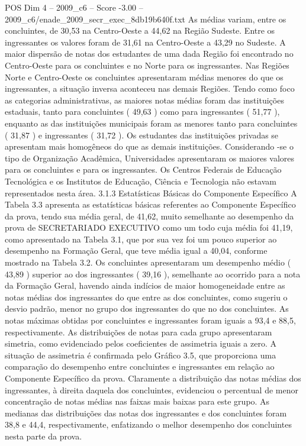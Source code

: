 \begin{textsample}{POS Dim 4 – 2009\_c6 – Score -3.00 – 2009\_c6/enade\_2009\_secr\_exec\_8db19b640f.txt}
As médias variam, entre os concluintes, de 30,53 na Centro-Oeste a 44,62 na Região Sudeste.
Entre os ingressantes os valores foram de 31,61 na Centro-Oeste a 43,29 no Sudeste.
A maior dispersão de notas dos estudantes de uma dada Região foi encontrado no Centro-Oeste para os concluintes e no Norte para os ingressantes.
Nas Regiões Norte e Centro-Oeste os concluintes apresentaram médias menores do que os ingressantes, a situação inversa aconteceu nas demais Regiões.
Tendo como foco as categorias administrativas, as maiores notas médias foram das instituições estaduais, tanto para concluintes ( 49,63 ) como para ingressantes ( 51,77 ), enquanto as das instituições municipais foram as menores tanto para concluintes ( 31,87 ) e ingressantes ( 31,72 ).
Os estudantes das instituições privadas se apresentam mais homogêneos do que as demais instituições.
Considerando -se o tipo de Organização Acadêmica, Universidades apresentaram os maiores valores para os concluintes e para os ingressantes.
Os Centros Federais de Educação Tecnológica e os Institutos de Educação, Ciência e Tecnologia não estavam representados nesta área. 3.1.3 Estatísticas Básicas do Componente Específico A Tabela 3.3 apresenta as estatísticas básicas referentes ao Componente Específico da prova, tendo sua média geral, de 41,62, muito semelhante ao desempenho da prova de SECRETARIADO EXECUTIVO como um todo cuja média foi 41,19, como apresentado na Tabela 3.1, que por sua vez foi um pouco superior ao desempenho na Formação Geral, que teve média igual a 40,04, conforme mostrado na Tabela 3.2.
Os concluintes apresentaram um desempenho médio ( 43,89 ) superior ao dos ingressantes ( 39,16 ), semelhante ao ocorrido para a nota da Formação Geral, havendo ainda indícios de maior homogeneidade entre as notas médias dos ingressantes do que entre as dos concluintes, como sugeriu o desvio padrão, menor no grupo dos ingressantes do que no dos concluintes.
As notas máximas obtidas por concluintes e ingressantes foram iguais a 93,4 e 88,5, respectivamente.
As distribuições de notas para cada grupo apresentaram simetria, como evidenciado pelos coeficientes de assimetria iguais a zero.
A situação de assimetria é confirmada pelo Gráfico 3.5, que proporciona uma comparação do desempenho entre concluintes e ingressantes em relação ao Componente Específico da prova.
Claramente a distribuição das notas médias dos ingressantes, à direita daquela dos concluintes, evidenciou o percentual de menor concentração de notas médias nas faixas mais baixas para este grupo.
As medianas das distribuições das notas dos ingressantes e dos concluintes foram 38,8 e 44,4, respectivamente, enfatizando o melhor desempenho dos concluintes nesta parte da prova.

\end{textsample}
